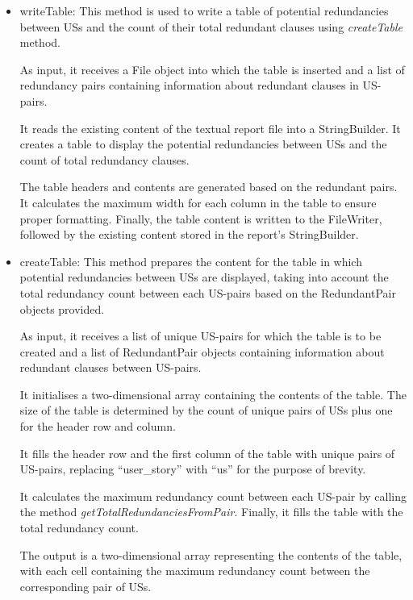 \begin{itemize}
	\item writeTable: This method is used to write a table of potential redundancies between USs and the count of their total redundant clauses using \textit{createTable} method.%
	
	As input, it receives a File object into which the table is inserted and a list of redundancy pairs containing information about redundant clauses in US-pairs.
	
	It reads the existing content of the textual report file into a StringBuilder. It creates a table to display the potential redundancies between USs and the count of total redundancy clauses.
	
	The table headers and contents are generated based on the redundant pairs. It calculates the maximum width for each column in the table to ensure proper formatting. Finally, the table content is written to the FileWriter, followed by the existing content stored in the report's StringBuilder.
	
	\item createTable: This method prepares the content for the table in which potential redundancies between USs are displayed, taking into account the total redundancy count between each US-pairs based on the RedundantPair objects provided.
	
	As input, it receives a list of unique US-pairs for which the table is to be created and a list of RedundantPair objects containing information about redundant clauses between US-pairs.
	
	It initialises a two-dimensional array containing the contents of the table. The size of the table is determined by the count of unique pairs of USs plus one for the header row and column.
	
	It fills the header row and the first column of the table with unique pairs of US-pairs, replacing \enquote{user\_story} with \enquote{us} for the purpose of brevity.
	
	It calculates the maximum redundancy count between each US-pair by calling the method \textit{getTotalRedundanciesFromPair}. Finally, it fills the table with the total redundancy count. 
	
	The output is a two-dimensional array representing the contents of the table, with each cell containing the maximum redundancy count between the corresponding pair of USs.
	

\end{itemize}
